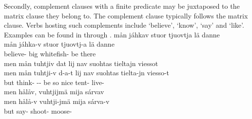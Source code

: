 Secondly, complement clauses with a finite predicate may be juxtaposed to the matrix clause they belong to. The complement clause typically follows the matrix clause. 
Verbs hosting such complements include  ‘believe’,  ‘know’,  ‘say’ and  ‘like’. %
Examples can be found in  through .%
\ea\label{complClauseJuxFin1}
\glll	mån jáhkav stuor tjuovtja lä danne\\
	mån jáhka-v stuor tjuovtj-a lä danne\\
	 believe- big whitefish- be\BS{} there\\\nopagebreak
{} 
\z
\ea\label{complClauseJuxFin2}%
\glll	men mån tuhtjiv dat lij nav suohtas tieltajn viessot\\
	men mån tuhtji-v d-a-t lij nav suohtas tielta-jn viesso-t\\
	but  think- -- be\BS{} so nice tent- live-\\\nopagebreak
{} 
\z
\ea\label{complClauseJuxFin3}%
\glll	men hålåv, vuhtjijmä mija sárvav\\
	men hålå-v vuhtji-jmä mija sárva-v\\
	but say- shoot-  moose-\\\nopagebreak
{} 
\z

